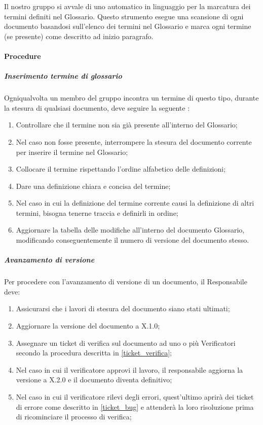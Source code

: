 Il nostro gruppo si avvale di uno  automatico in linguaggio  per la marcatura dei termini definiti nel Glossario. Questo strumento esegue una scansione di ogni documento basandosi sull'elenco dei termini nel Glossario e marca ogni termine (se presente) come descritto ad inizio paragrafo.



\paragraph{Procedure}

\subparagraph{Inserimento termine di glossario}
Ogniqualvolta un membro del gruppo incontra un termine di questo tipo, durante la stesura di qualsiasi documento, deve seguire la seguente :
\begin{enumerate}
\item Controllare che il termine non sia già presente all'interno del Glossario;
\item Nel caso non fosse presente, interrompere la stesura del documento corrente per inserire il termine nel Glossario;
\item Collocare il termine rispettando l'ordine alfabetico delle definizioni;
\item Dare una definizione chiara e concisa del termine;
\item Nel caso in cui la definizione del termine corrente causi la definizione di altri termini, bisogna tenerne traccia e definirli in ordine;
\item Aggiornare la tabella delle modifiche all'interno del documento Glossario, modificando conseguentemente il numero di versione del documento stesso.
\end{enumerate}

\subparagraph{Avanzamento di versione}
Per procedere con l'avanzamento di versione di un documento, il Responsabile deve:
\begin{enumerate}
\item Assicurarsi che i lavori di stesura del documento siano stati ultimati;
\item Aggiornare la versione del documento a X.1.0;
\item Assegnare un ticket di verifica sul documento ad uno o più Verificatori secondo la procedura descritta in \ref{ticket_verifica};
\item Nel caso in cui il verificatore approvi il lavoro, il responsabile aggiorna la versione a X.2.0 e il documento diventa definitivo;
\item Nel caso in cui il verificatore rilevi degli errori, quest'ultimo aprirà dei ticket di errore come descritto in \ref{ticket_bug} e attenderà la loro risoluzione prima di ricominciare il processo di verifica;
\end{enumerate}

